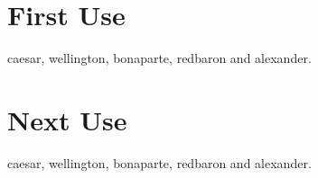 \documentclass{article}
\begin{document}
\section{First Use}

\gls{caesar}, \gls{wellington}, \gls{bonaparte}, \gls{redbaron}
and \gls{alexander}.

\section{Next Use}

\gls{caesar}, \gls{wellington}, \gls{bonaparte}, \gls{redbaron}
and \gls{alexander}.

\printunsrtglossary[title={People (Alphabetical)}]

\printunsrtglossary[type=bybirth,target=false]
\end{document}
